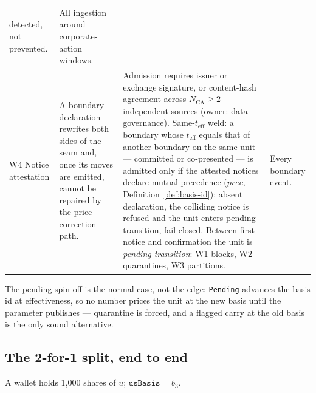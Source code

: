 \documentclass[11pt,a4paper]{article}
\begin{document}
\begin{center}
\begin{longtable}{@{}p{2.2cm} p{3.6cm} p{4.7cm} p{2.9cm}@{}}
detected, not prevented. & All ingestion around corporate-action windows. \\
\addlinespace
W4 Notice attestation & A boundary declaration rewrites both sides of the seam and,
once its moves are emitted, cannot be repaired by the price-correction path. & Admission
requires issuer or exchange signature, or content-hash agreement across
$N_{\mathrm{CA}}\ge2$ independent sources (owner: data governance). Same-$t_{\mathrm{eff}}$
weld: a boundary whose $t_{\mathrm{eff}}$ equals that of another boundary on the same
unit --- committed or co-presented --- is admitted only if the attested notices declare
mutual precedence ($\mathit{prec}$, Definition~\ref{def:basis-id}); absent
declaration, the colliding notice is refused and the unit enters pending-transition,
fail-closed. Between
first notice and confirmation the unit is \emph{pending-transition}: W1 blocks, W2
quarantines, W3 partitions. & Every boundary event. \\
\bottomrule
\end{longtable}
\end{center}

The pending spin-off is the normal case, not the edge: \texttt{Pending} advances the
basis id at effectiveness, so no number prices the unit at the new basis until the
parameter publishes --- quarantine is forced, and a flagged carry at the old basis is
the only sound alternative.

\subsection{The 2-for-1 split, end to end}
\label{sec:basis-worked}

A wallet holds 1{,}000 shares of $u$; $\texttt{usBasis}=b_3$.
\end{document}
